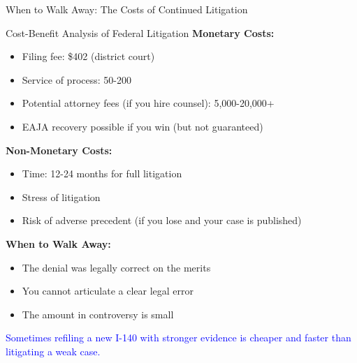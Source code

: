 \documentclass[11pt]{beamer}
\begin{document}
	\begin{frame}{When to Walk Away: The Costs of Continued Litigation}
		\scriptsize
		\begin{block}{Cost-Benefit Analysis of Federal Litigation}
			\textbf{Monetary Costs:}
			\begin{itemize}
				\item Filing fee: \$402 (district court)
				\item Service of process: 50-200
				\item Potential attorney fees (if you hire counsel): 5,000-20,000+
				\item EAJA recovery possible if you win (but not guaranteed)
			\end{itemize}
			\textbf{Non-Monetary Costs:}
			\begin{itemize}
				\item Time: 12-24 months for full litigation
				\item Stress of litigation
				\item Risk of adverse precedent (if you lose and your case is published)
			\end{itemize}
			\textbf{When to Walk Away:}
			\begin{itemize}
				\item The denial was legally correct on the merits
				\item You cannot articulate a clear legal error
				\item The amount in controversy is small
			\end{itemize}
			\textcolor{blue}{Sometimes refiling a new I-140 with stronger evidence is cheaper and faster than litigating a weak case.}
		\end{block}
	\end{frame}
	
\end{document}
